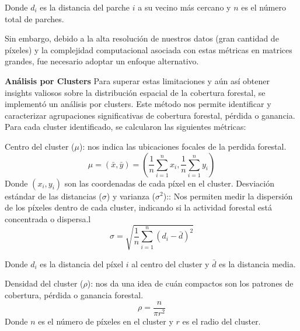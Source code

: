 \documentclass[11pt]{article}
\begin{document}
Donde $d_i$ es la distancia del parche $i$ a su vecino más cercano y $n$ es el número total de parches.

Sin embargo, debido a la alta resolución de nuestros datos (gran cantidad de píxeles) y la complejidad computacional asociada con estas métricas en matrices grandes, fue necesario adoptar un enfoque alternativo.

\textbf{Análisis por Clusters}
Para superar estas limitaciones y aún así obtener insights valiosos sobre la distribución espacial de la cobertura forestal, se implementó un análisis por clusters. Este método nos permite identificar y caracterizar agrupaciones significativas de cobertura forestal, pérdida o ganancia. Para cada cluster identificado, se calcularon las siguientes métricas:

Centro del cluster ($\mu$): nos indica las ubicaciones focales de la perdida forestal.
\begin{equation}\mu = (\bar{x}, \bar{y}) = (\frac{1}{n}\sum_{i=1}^n x_i, \frac{1}{n}\sum_{i=1}^n y_i)\end{equation}
Donde $(x_i, y_i)$ son las coordenadas de cada píxel en el cluster.
Desviación estándar de las distancias ($\sigma$) y varianza  ($\sigma^2$)::  Nos permiten medir la dispersión de los píxeles dentro de cada cluster, indicando si la actividad forestal está concentrada o dispersa.l
\begin{equation}\sigma = \sqrt{\frac{1}{n}\sum_{i=1}^n (d_i - \bar{d})^2}\end{equation}

Donde $d_i$ es la distancia del píxel $i$ al centro del cluster y $\bar{d}$ es la distancia media.


Densidad del cluster ($\rho$): nos da una idea de cuán compactos son los patrones de cobertura, pérdida o ganancia forestal.
\begin{equation}\rho = \frac{n}{\pi r^2}\end{equation}
Donde $n$ es el número de píxeles en el cluster y $r$ es el radio del cluster.
\end{document}
